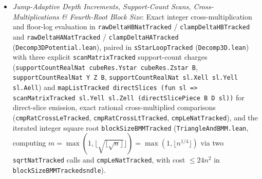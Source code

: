 \documentclass[10pt,letterpaper]{article}
\renewcommand{\_}{\origunderscore\allowbreak}
\newcommand{\code}[1]{\texttt{#1}}
\begin{document}
\begin{enumerate}
\begin{itemize}
$|X|$), \code{selectWitnessRow} inside \code{scanFinsetTracked X} in \code{dyadicSiftTracked} (\code{MinDegreeAndDyadicSift.lean:1036}, row~21, at charge $|X|+1$ so \code{dyadicSiftConcreteTracked\_fst} remains unconditional), Base Case~2 support-list preparation \code{suppBList Y Z B}, \code{(Y.card * Z.card) / 2 \^{} D}, and \code{splitListChunks} in \code{baseCase2DecompositionTracked} (\code{Decomp3DPotential.lean:859--866}, rows~68--69, dominated by the adjacent $\ge |X||Y| + |Y||Z| + 1$ \code{scanMatrixPairTracked} charges), and \code{blockSubTriplesList m} in \code{findBlockTriangleTracked} (\code{TriangleAndBMM.lean:3136}, row~100, dominated by the adjacent $3m^2+1$ \code{scanBlockExtractTracked} charge and $\le m^3+1$ \code{findSomeListByTracked} bound). Remaining unpriced pure expressions on the headline path consist only of index, tuple, and block enumerations (\code{List.range}, \code{piList T\_list d} at \code{ApproxGridNorm.lean:1389}, \code{blockTriplesList} at \code{TriangleAndBMM.lean:3628}), the terminal accumulator reversal \code{acc.reverse} (\code{Decomp2D.lean:418, 422}), parameter scalings (\code{2 \^{} accExp} and \code{d * accExp} at \code{MinDegreeAndDyadicSift.lean:2034}, \code{2 \^{} j * p\_ell} at \code{Decomp3D.lean:338}) dominated by their enclosing \code{mapListTracked}, \code{fold*}, or recursive calls, $O(1)$ word operations on cardinalities, the real-valued threshold parameters covered by the representation assumptions below, and the support and neighborhood filters (\code{suppA}, \code{suppB}, \code{S\_k}, \code{N\_A}, \code{N\_B} in \code{detectOnPieceNatTracked}) already paid for by the preceding \code{scanMatrixPairTracked} / \code{scanMatrixTracked} charges.
    \item \emph{Jump-Adaptive Depth Increments, Support-Count Scans, Cross-Multiplications \& Fourth-Root Block Size}: Exact integer cross-multiplication and floor-log evaluation in \code{rawDeltaHBNatTracked} / \code{clampDeltaHBTracked} and \code{rawDeltaHANatTracked} / \code{clampDeltaHATracked} (\code{Decomp3DPotential.lean}), paired in \code{sStarLoopTracked} (\code{Decomp3D.lean}) with three explicit \code{scanMatrixTracked} support-count charges (\code{supportCountRealNat cubeRes.Y\_star cubeRes.Z\_star B}, \code{supportCountRealNat Y Z B}, \code{supportCountRealNat sl.X\_ell sl.Y\_ell sl.A\_ell}) and \code{mapListTracked directSlices (fun sl => scanMatrixTracked sl.Y\_ell sl.Z\_ell (directSlicePiece B D sl))} for direct-slice emission, exact rational cross-multiplied comparisons (\code{cmpRatCrossLeTracked}, \code{cmpRatCrossLtTracked}, \code{cmpLeNatTracked}), and the iterated integer square root \code{blockSizeBMMTracked} (\code{TriangleAndBMM.lean}, computing $m = \max(1, \lfloor \sqrt{\lfloor \sqrt{n} \rfloor} \rfloor) = \max(1, \lfloor n^{1/4} \rfloor)$ via two \code{sqrtNatTracked} calls and \code{cmpLeNatTracked}, with cost $\le 24 n^2$ in \code{blockSizeBMMTracked\_snd\_le}).
  \end{itemize}


\end{enumerate}
\end{document}
